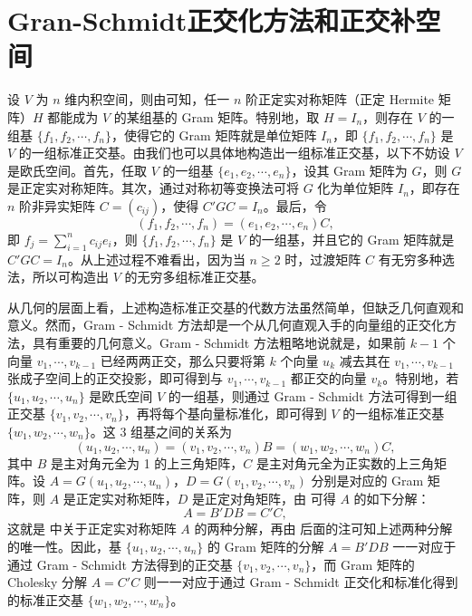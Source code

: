 \documentclass[../../main.tex]{subfiles}
\begin{document}
\section{Gran-Schmidt正交化方法和正交补空间}

设 $V$ 为 $n$ 维内积空间，则由可知，任一 $n$ 阶正定实对称矩阵（正定 Hermite 矩阵）$H$ 都能成为 $V$ 的某组基的 Gram 矩阵。特别地，取 $H = I_n$，则存在 $V$ 的一组基 $\{f_1,f_2,\cdots,f_n\}$，使得它的 Gram 矩阵就是单位矩阵 $I_n$，即 $\{f_1,f_2,\cdots,f_n\}$ 是 $V$ 的一组标准正交基。由我们也可以具体地构造出一组标准正交基，以下不妨设 $V$ 是欧氏空间。首先，任取 $V$ 的一组基 $\{e_1,e_2,\cdots,e_n\}$，设其 Gram 矩阵为 $G$，则 $G$ 是正定实对称矩阵。其次，通过对称初等变换法可将 $G$ 化为单位矩阵 $I_n$，即存在 $n$ 阶非异实矩阵 $C = (c_{ij})$，使得 $C'GC = I_n$。最后，令
\[
(f_1,f_2,\cdots,f_n)=(e_1,e_2,\cdots,e_n)C,
\]
即 $f_j = \sum_{i = 1}^{n}c_{ij}e_i$，则 $\{f_1,f_2,\cdots,f_n\}$ 是 $V$ 的一组基，并且它的 Gram 矩阵就是 $C'GC = I_n$。从上述过程不难看出，因为当 $n\geq2$ 时，过渡矩阵 $C$ 有无穷多种选法，所以可构造出 $V$ 的无穷多组标准正交基。

从几何的层面上看，上述构造标准正交基的代数方法虽然简单，但缺乏几何直观和意义。然而，Gram - Schmidt 方法却是一个从几何直观入手的向量组的正交化方法，具有重要的几何意义。Gram - Schmidt 方法粗略地说就是，如果前 $k - 1$ 个向量 $v_1,\cdots,v_{k - 1}$ 已经两两正交，那么只要将第 $k$ 个向量 $u_k$ 减去其在 $v_1,\cdots,v_{k - 1}$ 张成子空间上的正交投影，即可得到与 $v_1,\cdots,v_{k - 1}$ 都正交的向量 $v_k$。特别地，若 $\{u_1,u_2,\cdots,u_n\}$ 是欧氏空间 $V$ 的一组基，则通过 Gram - Schmidt 方法可得到一组正交基 $\{v_1,v_2,\cdots,v_n\}$，再将每个基向量标准化，即可得到 $V$ 的一组标准正交基 $\{w_1,w_2,\cdots,w_n\}$。这 3 组基之间的关系为
\[
(u_1,u_2,\cdots,u_n)=(v_1,v_2,\cdots,v_n)B=(w_1,w_2,\cdots,w_n)C,
\]
其中 $B$ 是主对角元全为 1 的上三角矩阵，$C$ 是主对角元全为正实数的上三角矩阵。设 $A = G(u_1,u_2,\cdots,u_n)$，$D = G(v_1,v_2,\cdots,v_n)$ 分别是对应的 Gram 矩阵，则 $A$ 是正定实对称矩阵，$D$ 是正定对角矩阵，由 可得 $A$ 的如下分解：
\[
A = B'DB = C'C,
\]
这就是 中关于正定实对称矩阵 $A$ 的两种分解，再由 后面的注可知上述两种分解的唯一性。因此，基 $\{u_1,u_2,\cdots,u_n\}$ 的 Gram 矩阵的分解 $A = B'DB$ 一一对应于通过 Gram - Schmidt 方法得到的正交基 $\{v_1,v_2,\cdots,v_n\}$，而 Gram 矩阵的 Cholesky 分解 $A = C'C$ 则一一对应于通过 Gram - Schmidt 正交化和标准化得到的标准正交基 $\{w_1,w_2,\cdots,w_n\}$。
\end{document}
